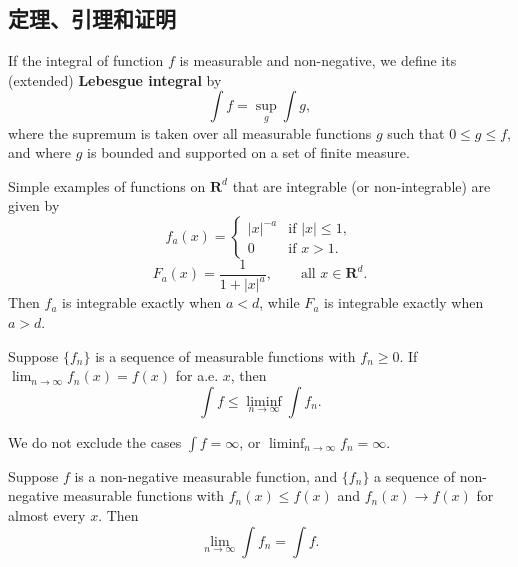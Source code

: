 \subsection{定理、引理和证明}

\begin{definition}
	If the integral of function $f$ is measurable and non-negative, we define
	its (extended) \textbf{Lebesgue integral} by
	\begin{equation}
	\int f = \sup_g \int g,
	\end{equation}
	where the supremum is taken over all measurable functions $g$ such that
	$0 \leq g \leq f$, and where $g$ is bounded and supported on a set of
	finite measure.
\end{definition}

\begin{example}
	Simple examples of functions on $\mathbf{R}^d$ that are integrable
	(or non-integrable) are given by
	\begin{equation}
	f_a(x) =
	\begin{cases}
	|x|^{-a} & \text{if } |x| \leq 1,\\
	0 & \text{if } x > 1.
	\end{cases}
	\end{equation}
	\begin{equation}
	F_a(x) = \frac{1}{1 + |x|^a}, \qquad \text{all } x \in \mathbf{R}^d.
	\end{equation}
	Then $f_a$ is integrable exactly when $a < d$, while $F_a$ is integrable
	exactly when $a > d$.
\end{example}

\begin{lemma}[Fatou]
	Suppose $\{f_n\}$ is a sequence of measurable functions with $f_n \geq 0$.
	If $\lim_{n \to \infty} f_n(x) = f(x)$ for a.e. $x$, then
	\begin{equation}
	\int f \leq \liminf_{n \to \infty} \int f_n.
	\end{equation}
\end{lemma}

\begin{remark}
	We do not exclude the cases $\int f = \infty$,
	or $\liminf_{n \to \infty} f_n = \infty$.
\end{remark}

\begin{corollary}
	Suppose $f$ is a non-negative measurable function, and $\{f_n\}$ a sequence
	of non-negative measurable functions with
	$f_n(x) \leq f(x)$ and $f_n(x) \to f(x)$ for almost every $x$. Then
	\begin{equation}
	\lim_{n \to \infty} \int f_n = \int f.
	\end{equation}
\end{corollary}

